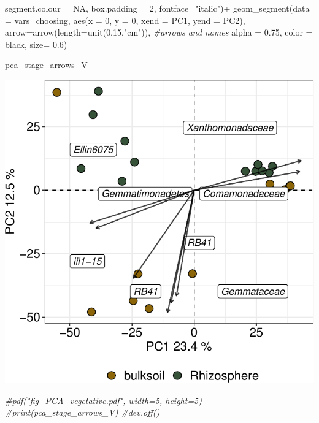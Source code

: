\documentclass[]{interact}
\theoremstyle{plain}%
\theoremstyle{definition}
\theoremstyle{remark}
\newenvironment{Shaded}{\begin{snugshade}}{\end{snugshade}}
\newcommand{\AttributeTok}[1]{\textcolor[rgb]{0.77,0.63,0.00}{#1}}
\newcommand{\CommentTok}[1]{\textcolor[rgb]{0.56,0.35,0.01}{\textit{#1}}}
\newcommand{\ConstantTok}[1]{\textcolor[rgb]{0.00,0.00,0.00}{#1}}
\newcommand{\DecValTok}[1]{\textcolor[rgb]{0.00,0.00,0.81}{#1}}
\newcommand{\FloatTok}[1]{\textcolor[rgb]{0.00,0.00,0.81}{#1}}
\newcommand{\FunctionTok}[1]{\textcolor[rgb]{0.00,0.00,0.00}{#1}}
\newcommand{\NormalTok}[1]{#1}
\newcommand{\SpecialCharTok}[1]{\textcolor[rgb]{0.00,0.00,0.00}{#1}}
\newcommand{\StringTok}[1]{\textcolor[rgb]{0.31,0.60,0.02}{#1}}
\begin{document}
\begin{Shaded}
\begin{Highlighting}[]
                            \AttributeTok{segment.colour =} \ConstantTok{NA}\NormalTok{, }\AttributeTok{box.padding =} \DecValTok{2}\NormalTok{, }\AttributeTok{fontface=}\StringTok{"italic"}\NormalTok{)}\SpecialCharTok{+}
  \FunctionTok{geom\_segment}\NormalTok{(}\AttributeTok{data =}\NormalTok{ vars\_choosing, }\FunctionTok{aes}\NormalTok{(}\AttributeTok{x =} \DecValTok{0}\NormalTok{, }\AttributeTok{y =} \DecValTok{0}\NormalTok{, }\AttributeTok{xend =}\NormalTok{ PC1, }\AttributeTok{yend =}\NormalTok{ PC2), }
               \AttributeTok{arrow=}\FunctionTok{arrow}\NormalTok{(}\AttributeTok{length=}\FunctionTok{unit}\NormalTok{(}\FloatTok{0.15}\NormalTok{,}\StringTok{"cm"}\NormalTok{)), }\CommentTok{\#arrows and names}
               \AttributeTok{alpha =} \FloatTok{0.75}\NormalTok{, }\AttributeTok{color =} \StringTok{\textquotesingle{}black\textquotesingle{}}\NormalTok{, }\AttributeTok{size=} \FloatTok{0.6}\NormalTok{)}

\NormalTok{pca\_stage\_arrows\_V}
\end{Highlighting}
\end{Shaded}

\begin{center}\includegraphics{Doc_pdf_files/figure-latex/unnamed-chunk-36-1} \end{center}

\begin{Shaded}
\begin{Highlighting}[]
\CommentTok{\#pdf("fig\_PCA\_vegetative.pdf", width=5, height=5)}
\CommentTok{\#print(pca\_stage\_arrows\_V)}
\CommentTok{\#dev.off()}
\end{Highlighting}
\end{Shaded}
\end{document}
